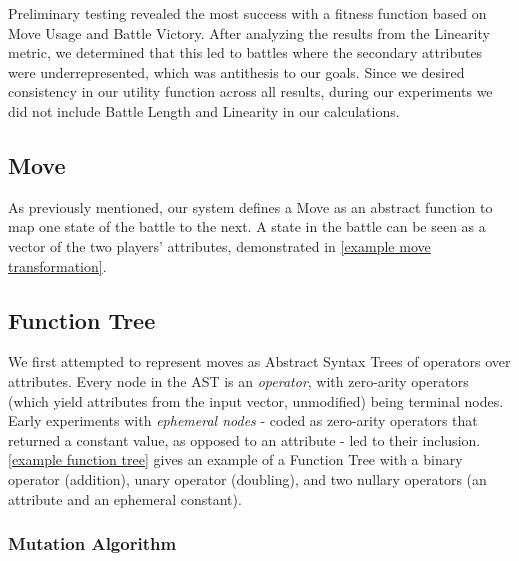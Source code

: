 \documentclass{acm_proc_article-sp}
\begin{document}
Preliminary testing revealed the most success with a fitness function based on Move Usage and Battle Victory. After analyzing the results from the Linearity metric, we determined that this led to battles where the secondary attributes were underrepresented, which was antithesis to our goals. Since we desired consistency in our utility function across all results, during our experiments we did not include Battle Length and Linearity in our calculations.

\subsection{Move}

As previously mentioned, our system defines a Move as an abstract function to map one state of the battle to the next. A state in the battle can be seen as a vector of the two players’ attributes, demonstrated in \ref{example move transformation}. 

\subsection{Function Tree}

We first attempted to represent moves as Abstract Syntax Trees of operators over attributes. Every node in the AST is an \textit{operator}, with zero-arity operators (which yield attributes from the input vector, unmodified) being terminal nodes. Early experiments with \textit{ephemeral nodes} - coded as zero-arity operators that returned a constant value, as opposed to an attribute - led to their inclusion. \ref{example function tree} gives an example of a Function Tree with a binary operator (addition), unary operator (doubling), and two nullary operators (an attribute and an ephemeral constant).

\subsubsection{Mutation Algorithm}
\end{document}
